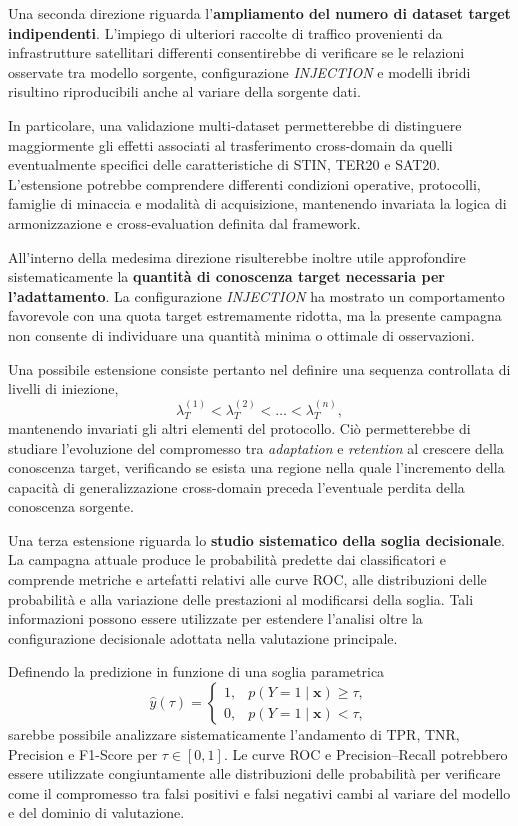 Una seconda direzione riguarda l'\textbf{ampliamento del numero di dataset target indipendenti}.
L'impiego di ulteriori raccolte di traffico provenienti da infrastrutture satellitari differenti consentirebbe di verificare se le relazioni osservate tra modello sorgente, configurazione \textit{INJECTION} e modelli ibridi risultino riproducibili anche al variare della sorgente dati.

In particolare, una validazione multi-dataset permetterebbe di distinguere maggiormente gli effetti associati al trasferimento cross-domain da quelli eventualmente specifici delle caratteristiche di STIN, TER20 e SAT20.
L'estensione potrebbe comprendere differenti condizioni operative, protocolli, famiglie di minaccia e modalità di acquisizione, mantenendo invariata la logica di armonizzazione e cross-evaluation definita dal framework.

All'interno della medesima direzione risulterebbe inoltre utile approfondire sistematicamente la \textbf{quantità di conoscenza target necessaria per l'adattamento}.
La configurazione \textit{INJECTION} ha mostrato un comportamento favorevole con una quota target estremamente ridotta, ma la presente campagna non consente di individuare una quantità minima o ottimale di osservazioni.

Una possibile estensione consiste pertanto nel definire una sequenza controllata di livelli di iniezione,
\[
    \lambda_{T}^{(1)} < \lambda_{T}^{(2)} < \dots < \lambda_{T}^{(n)},
\]
mantenendo invariati gli altri elementi del protocollo.
Ciò permetterebbe di studiare l'evoluzione del compromesso tra \textit{adaptation} e \textit{retention} al crescere della conoscenza target, verificando se esista una regione nella quale l'incremento della capacità di generalizzazione cross-domain preceda l'eventuale perdita della conoscenza sorgente.

Una terza estensione riguarda lo \textbf{studio sistematico della soglia decisionale}.
La campagna attuale produce le probabilità predette dai classificatori e comprende metriche e artefatti relativi alle curve ROC, alle distribuzioni delle probabilità e alla variazione delle prestazioni al modificarsi della soglia.
Tali informazioni possono essere utilizzate per estendere l'analisi oltre la configurazione decisionale adottata nella valutazione principale.

Definendo la predizione in funzione di una soglia parametrica
\[
    \hat{y}(\tau) =
    \begin{cases}
        1, & p(Y=1 \mid \mathbf{x}) \geq \tau, \\
        0, & p(Y=1 \mid \mathbf{x}) < \tau,
    \end{cases}
\]
sarebbe possibile analizzare sistematicamente l'andamento di TPR, TNR, Precision e F1-Score per $\tau \in [0,1]$.
Le curve ROC e Precision--Recall potrebbero essere utilizzate congiuntamente alle distribuzioni delle probabilità per verificare come il compromesso tra falsi positivi e falsi negativi cambi al variare del modello e del dominio di valutazione.


